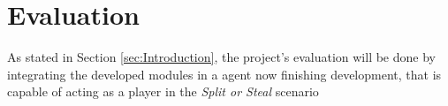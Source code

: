 \section{Evaluation}
\label{sec:Evaluation}
As stated in Section \ref{sec:Introduction}, the project's evaluation will be done by integrating the developed modules in a agent now finishing development, that is capable of acting as a player in the \textit{Split or Steal} scenario